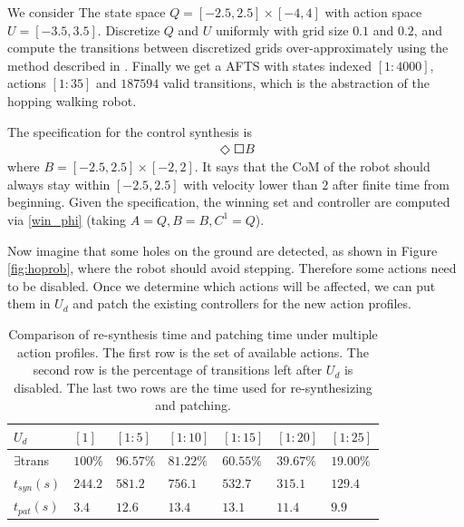 {\color{purple} We consider } The state space $ Q = [-2.5,2.5]\times [-4,4] $ with action space $ U = [-3.5,3.5] $. Discretize $ Q $ and $ U $ uniformly with grid size $ 0.1 $ and $ 0.2 $, and compute the transitions between discretized grids over-approximately  using the method described in \cite{Liu2014,Sun2014}. Finally we get a AFTS with states indexed $ [1:4000] $, actions $ [1:35] $ and $ 187594 $ valid transitions, which is the abstraction of the hopping {\color{purple} walking} robot. 

The specification for the control synthesis is 
\begin{align}
\Diamond \Square B
\end{align}
where $ B=[-2.5,2.5]\times[-2,2] $. It says that the CoM of the robot should always stay within $ [-2.5,2.5] $ with velocity lower than $ 2 $ after finite time from beginning. Given the specification, the winning set and controller are computed via \eqref{win_phi} (taking $ A = Q,B=B , C^1 = Q $).

Now imagine that some holes on the ground are detected, as shown in Figure \ref{fig:hoprob}, where the robot should avoid stepping. Therefore some actions need to be disabled. Once we determine which actions will be affected, we can put them in $ U_d $ and patch the existing controllers for the new action profiles.
\begin{table}
	\caption{Comparison of re-synthesis time and patching time under multiple action profiles. The first row is the set of available actions. The second row is the percentage of transitions left after $ U_d $ is disabled. The last two rows are the time used for re-synthesizing and patching.}
	\begin{tabular}{lllllll}
		\hline 
		$ U_d $ & $ [1] $ &$ [1:5] $ & $ [1:10] $ & $ [1:15] $ & $ [1:20] $ & $ [1:25] $ \\ 
		\hline 
		$ \exists $trans & $ 100\% $ & $ 96.57\% $ & $ 81.22\% $ & $ 60.55\% $ & $ 39.67\% $ & $ 19.00\% $\\
		$ t_{syn}(s) $ & $ 244.2 $ & $ 581.2 $ & $ 756.1 $ & $ 532.7 $ & $ 315.1 $ & $ 129.4 $ \\
		$ t_{pat}(s)$ & $ 3.4 $ & $ 12.6 $ & $ 13.4 $ & $ 13.1 $ & $ 11.4 $ & $ 9.9 $ \\ 
		\hline 
	\end{tabular} 
	\label{tab: exper}
\end{table}

